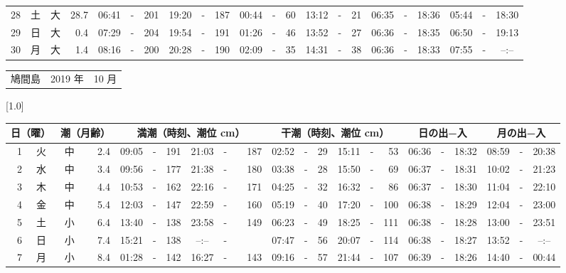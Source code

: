 \documentclass[12pt,a4j]{jsarticle}
\begin{document}
\begin{table}[htbp]
\begin{center}
{\begin{tabular}{|rc|cr|ccrccr|ccrccr|ccc|ccc|}
28 & 土 & 大 & 28.7 &  06:41 &-& 201 &  19:20 &-& 187 &  00:44 &-&  60 &  13:12 &-&  21 & 06:35 & -& 18:36 & 05:44 & -& 18:30 \\
29 & 日 & 大 &  0.4 &  07:29 &-& 204 &  19:54 &-& 191 &  01:26 &-&  46 &  13:52 &-&  27 & 06:36 & -& 18:35 & 06:50 & -& 19:13 \\
30 & 月 & 大 &  1.4 &  08:16 &-& 200 &  20:28 &-& 190 &  02:09 &-&  35 &  14:31 &-&  38 & 06:36 & -& 18:33 & 07:55 & -& --:-- \\
   \hline
   \end{tabular}}
   \end{center}
\end{table}
\newpage
 \begin{table}[htbp]
 \begin{center}
 \begin{tabular}{lcc}
 \LARGE{鳩間島}  & \large{2019 年} & \large{10 月} \\
 \end{tabular}
 \end{center}
 \begin{center}
    \scalebox{0.7}[1.0]{
    \begin{tabular}{|rc|cr|ccrccr|ccrccr|ccc|ccc|}
    \hline
    \multicolumn{2}{|c|}{日（曜）} & \multicolumn{2}{c|}{潮（月齢）} & \multicolumn{6}{c|}{満潮（時刻、潮位 cm）} & \multicolumn{6}{c|}{干潮（時刻、潮位 cm）} & \multicolumn{3}{c|}{日の出−入} &  \multicolumn{3}{c|}{月の出−入}\\
 \hline
 1 & 火 & 中 &  2.4 &  09:05 &-& 191 &  21:03 &-& 187 &  02:52 &-&  29 &  15:11 &-&  53 & 06:36 & -& 18:32 & 08:59 & -& 20:38 \\
 2 & 水 & 中 &  3.4 &  09:56 &-& 177 &  21:38 &-& 180 &  03:38 &-&  28 &  15:50 &-&  69 & 06:37 & -& 18:31 & 10:02 & -& 21:23 \\
 3 & 木 & 中 &  4.4 &  10:53 &-& 162 &  22:16 &-& 171 &  04:25 &-&  32 &  16:32 &-&  86 & 06:37 & -& 18:30 & 11:04 & -& 22:10 \\
 4 & 金 & 中 &  5.4 &  12:03 &-& 147 &  22:59 &-& 160 &  05:19 &-&  40 &  17:20 &-& 100 & 06:38 & -& 18:29 & 12:04 & -& 23:00 \\
 5 & 土 & 小 &  6.4 &  13:40 &-& 138 &  23:58 &-& 149 &  06:23 &-&  49 &  18:25 &-& 111 & 06:38 & -& 18:28 & 13:00 & -& 23:51 \\
 6 & 日 & 小 &  7.4 &  15:21 &-& 138 &  --:-- &-&~~~~~ &  07:47 &-&  56 &  20:07 &-& 114 & 06:38 & -& 18:27 & 13:52 & -& --:-- \\
 7 & 月 & 小 &  8.4 &  01:28 &-& 142 &  16:27 &-& 143 &  09:16 &-&  57 &  21:44 &-& 107 & 06:39 & -& 18:26 & 14:40 & -& 00:44 \\

\end{tabular}}
\end{center}
\end{table}
\end{document}
